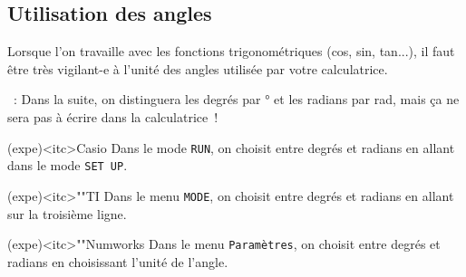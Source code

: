 \documentclass[a4paper, 12pt, garamond]{book}
\begin{document}
\subsection{Utilisation des angles}

Lorsque l'on travaille avec les fonctions trigonométriques (cos, sin, tan...),
il faut être très vigilant-e à l'unité des angles utilisée par votre
calculatrice.

~: Dans la suite, on distinguera les degrés par \si{\degree}
et les radians par \si{rad}, mais ça ne sera pas à écrire dans la calculatrice~!

\begin{tcbraster}[raster columns=3, raster equal height=rows]
	\begin{tcn}(expe)<itc>{Casio}
		Dans le mode \texttt{RUN}, on choisit entre degrés et radians en allant dans
		le mode \texttt{SET UP}.
	\end{tcn}
	\begin{tcn}(expe)<itc>""{TI}
		Dans le menu \texttt{MODE}, on choisit entre degrés et radians en allant sur
		la troisième ligne.
	\end{tcn}
	\begin{tcn}(expe)<itc>""{Numworks}
		Dans le menu \texttt{Paramètres}, on choisit entre degrés et radians en
		choisissant l'unité de l'angle.
	\end{tcn}
\end{tcbraster}
\end{document}
